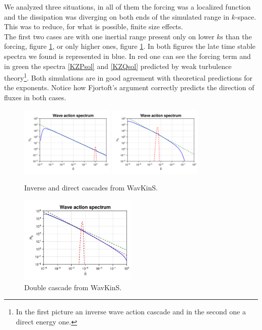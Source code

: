     We analyzed three situations, in all of them the forcing was a localized function and the dissipation was diverging on both ends of the simulated range in $k$-space. This was to reduce, for what is possible, finite size effects.\\
    The first two cases are with one inertial range present only on lower $k$s than the forcing, figure \ref{fig:cascdir}, or only higher ones, figure \ref{fig:cascdir}. In both figures the late time stable spectra we found is represented in blue. In red one can see the forcing term and in green the spectra
    \eqref{KZPsol} and \eqref{KZQsol} predicted by weak turbulence theory\footnote{In the first picture an inverse wave action cascade and in the second one a direct energy one.}. Both simulations are in good agreement with theoretical predictions for the exponents.
    Notice how Fjortoft's argument correctly predicts the direction of fluxes in both cases. 
    \begin{figure}[ht]
        \centering
            \includegraphics[width=0.4\textwidth]{images/MMT_inverse_256_[1.0e-5-10.0].png}
            \includegraphics[width=0.4\textwidth]{images/MMT_direct_256[1.0e-6_1.0].png}
            \vspace{-0.5cm}
            \caption{Inverse and direct cascades from WavKinS.}
            \label{fig:cascdir}
    \end{figure}
    \begin{figure}[ht]
        \centering
        \includegraphics[width=0.5\textwidth]{images/double_cascade3.jpg}
        \vspace{-0.5cm}
        \caption{Double cascade from WavKinS.}
        \label{fig:cascdouble}
    \end{figure}
